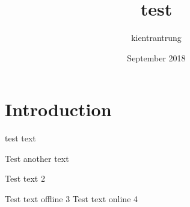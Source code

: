 \documentclass{article}
\title{test}
\author{kientrantrung }
\date{September 2018}
\begin{document}
\maketitle

\section{Introduction}
test text

Test another text

Test text 2

Test text offline 3
Test text online 4
\end{document}
